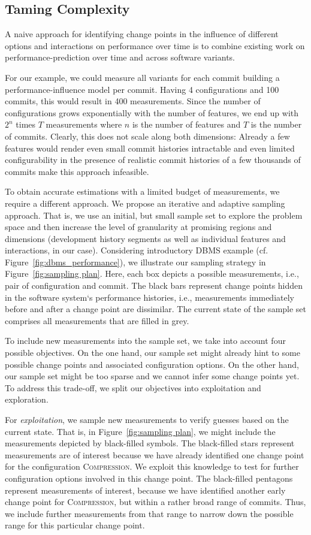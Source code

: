 \documentclass[sigconf]{acmart}
\begin{document}
	\subsection{Taming Complexity}
	A naive approach for identifying change points in the influence of different options and interactions on performance over time is to combine existing work on performance-prediction over time and across software variants.
	
	For our example, we could measure all variants for each commit building a performance-influence model per commit.
	Having 4 configurations and 100 commits, this would result in 400 measurements.
	Since the number of configurations grows exponentially with the number of features, we end up with $2^n$ times $T$ measurements where $n$ is the number of features and $T$ is the number of commits.
	Clearly, this does not scale along both dimensions: Already a few features would render even small commit histories intractable and even limited configurability in the presence of realistic commit histories of a few thousands of commits make this approach infeasible.
	
	To obtain accurate estimations with a limited budget of measurements, we require a different approach. We propose an iterative and adaptive sampling approach. That is, we use an initial, but small sample set to explore the problem space and then increase the level of granularity at promising regions and dimensions (development history segments as well as individual features and interactions, in our case). 
	Considering introductory DBMS example (cf. Figure~\ref{fig:dbms_performance}), we illustrate our sampling strategy in Figure~\ref{fig:sampling plan}. Here, each box depicts a possible measurements, i.e., pair of configuration and commit. The black bars represent change points hidden in the software system‘s performance histories, i.e., measurements immediately before and after a change point are dissimilar. The current state of the sample set comprises all measurements that are filled in grey. 
	
	To include new measurements into the sample set, we take into account four possible objectives. On the one hand, our sample set might already hint to some possible change points and associated configuration options. On the other hand, our sample set might be too sparse and we cannot infer some change points yet. To address this trade-off, we split our objectives into exploitation and exploration.
	
	 For \emph{exploitation}, we sample new measurements to verify guesses based on the current state. That is, in Figure~\ref{fig:sampling plan}, we might include the measurements depicted by black-filled symbols. The black-filled stars represent measurements are of interest because we have already identified one change point for the configuration \textsc{Compression}. We exploit this knowledge to test for further configuration options involved in this change point. The black-filled pentagons represent measurements of interest, because we have identified another early change point for \textsc{Compression}, but within a rather broad range of commits. Thus, we include further measurements from that range to narrow down the possible range for this particular change point. 
	 
\end{document}
